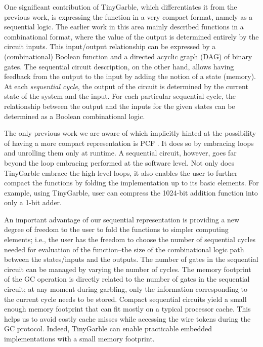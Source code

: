 One significant contribution of TinyGarble, which differentiates it from the previous work, is expressing the function in a very compact format, namely as a sequential logic.
The earlier work in this area mainly described functions in a combinational format, where the value of the output is determined entirely by the circuit inputs.
This input/output relationship can be expressed by a (combinational) Boolean function and a directed acyclic graph (DAG) of binary gates.
The sequential circuit description, on the other hand, allows having feedback from the output to the input by adding the notion of a state (memory).
At each \emph{sequential cycle}, the output of the circuit is determined by the current state of the system and the input.
For each particular sequential cycle, the relationship between the output and the inputs for the given states can be determined as a Boolean combinational logic.

The only previous work we are aware of which implicitly hinted at the possibility of having a more compact representation is PCF \cite{kreuter2013pcf}.
It does so by embracing loops and unrolling them only at runtime.
A sequential circuit, however, goes far beyond the loop embracing performed at the software level.
Not only does TinyGarble embrace the high-level loops, it also enables the user to further compact the functions by folding the implementation up to its basic elements.
For example, using TinyGarble, user can compress the 1024-bit addition function into only a 1-bit adder.

An important advantage of our sequential representation is providing a new degree of freedom to the user to fold the functions to simpler computing elements; i.e., the user has the freedom to choose the number of sequential cycles needed for evaluation of the function--the size of the combinational logic path between the states/inputs and the outputs.
The number of gates in the sequential circuit can be managed by varying the number of cycles.
The memory footprint of the GC operation is directly related to the number of gates in the sequential circuit; at any moment during garbling, only the information corresponding to the current cycle needs to be stored.
Compact sequential circuits yield a small enough memory footprint that can fit mostly on a typical processor cache.
This helps us to avoid costly cache misses while accessing the wire tokens during the GC protocol.
Indeed, TinyGarble can enable practicable embedded implementations with a small memory footprint.

